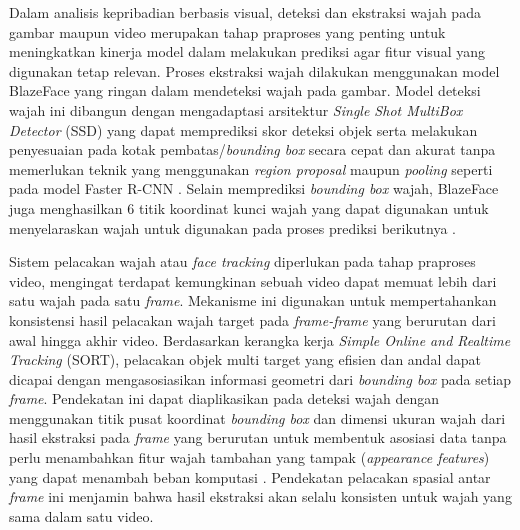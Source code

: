 Dalam analisis kepribadian berbasis visual, deteksi dan ekstraksi wajah pada gambar maupun video merupakan tahap praproses yang penting untuk meningkatkan kinerja model dalam melakukan prediksi agar fitur visual yang digunakan tetap relevan. Proses ekstraksi wajah dilakukan menggunakan model BlazeFace yang ringan dalam mendeteksi wajah pada gambar. Model deteksi wajah ini dibangun dengan mengadaptasi arsitektur \textit{Single Shot MultiBox Detector} (SSD) yang dapat memprediksi skor deteksi objek serta melakukan penyesuaian pada kotak pembatas/\textit{bounding box} secara cepat dan akurat tanpa memerlukan teknik yang menggunakan \textit{region proposal} maupun \textit{pooling} seperti pada model Faster R-CNN \parencite{Liu2016}. Selain memprediksi \textit{bounding box} wajah, BlazeFace juga menghasilkan 6 titik koordinat kunci wajah yang dapat digunakan untuk menyelaraskan wajah untuk digunakan pada proses prediksi berikutnya \parencite{Bazarevsky2019}. 

Sistem pelacakan wajah atau \textit{face tracking} diperlukan pada tahap praproses video, mengingat terdapat kemungkinan sebuah video dapat memuat lebih dari satu wajah pada satu \textit{frame}. Mekanisme ini digunakan untuk mempertahankan konsistensi hasil pelacakan wajah target pada \textit{frame-frame} yang berurutan dari awal hingga akhir video. Berdasarkan kerangka kerja \textit{Simple Online and Realtime Tracking} (SORT), pelacakan objek multi target yang efisien dan andal dapat dicapai dengan mengasosiasikan informasi geometri dari \textit{bounding box} pada setiap \textit{frame}. Pendekatan ini dapat diaplikasikan pada deteksi wajah dengan menggunakan titik pusat koordinat \textit{bounding box} dan dimensi ukuran wajah dari hasil ekstraksi pada \textit{frame} yang berurutan untuk membentuk asosiasi data tanpa perlu menambahkan fitur wajah tambahan yang tampak (\textit{appearance features}) yang dapat menambah beban komputasi \parencite{Bewley2017}. Pendekatan pelacakan spasial antar \textit{frame} ini menjamin bahwa hasil ekstraksi akan selalu konsisten untuk wajah yang sama dalam satu video.


